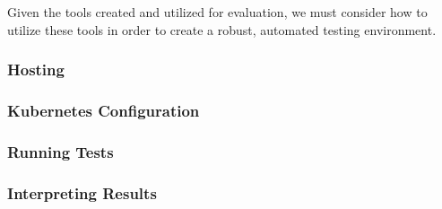Given the tools created and utilized for evaluation, we must consider how to
utilize these tools in order to create a robust, automated testing environment.

\subsubsection{Hosting}



\subsubsection{Kubernetes Configuration}



\subsubsection{Running Tests}



\subsubsection{Interpreting Results}


